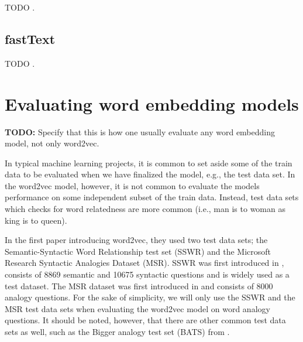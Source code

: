 TODO \cite{pennington2014glove}.

\subsection{fastText}
TODO \cite{bojanowski2017enriching}.

\section{Evaluating word embedding models}
\label{sec:eval-word2vec-model}
\textbf{TODO:} Specify that this is how one usually evaluate any word embedding model, not only word2vec.

In typical machine learning projects, it is common to set aside some of the train data to be evaluated when we have finalized the model, e.g., the test data set. In the word2vec model, however, it is not common to evaluate the models performance on some independent subset of the train data. Instead, test data sets which checks for word relatedness are more common (i.e., man is to woman as king is to queen).

In the first paper introducing word2vec, they used two test data sets; the Semantic-Syntactic Word Relationship test set (SSWR) and the Microsoft Research Syntactic Analogies Dataset (MSR). SSWR was first introduced in \cite{mikolov2013a}, consists of 8869 semantic and 10675 syntactic questions and is widely used as a test dataset. The MSR dataset was first introduced in \cite{mikolov-etal-2013-linguistic} and consists of 8000 analogy questions. For the sake of simplicity, we will only use the SSWR and the MSR test data sets when evaluating the word2vec model on word analogy questions. It should be noted, however, that there are other common test data sets as well, such as the Bigger analogy test set (BATS) from \cite{gladkova-etal-2016-analogy}.